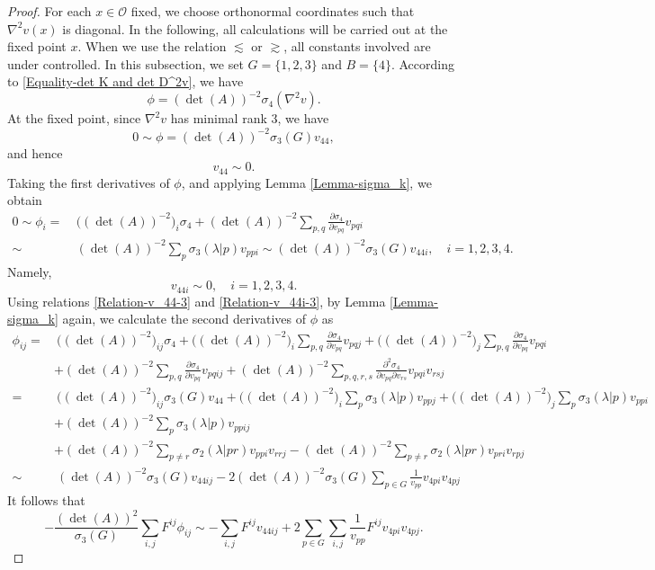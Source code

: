 \documentclass[11pt]{amsart}
\numberwithin{theorem}{section}
\numberwithin{equation}{section}
\begin{document}
\begin{proof}
For each $x\in\mathcal{O}$ fixed, we choose orthonormal coordinates such that $\nabla^2v(x)$ is diagonal. In the following, all calculations will be carried out at the fixed point $x$. When we use the relation $\lesssim$ or $\gtrsim$, all constants involved are under controlled. In this subsection, we set $G=\{1, 2, 3\}$ and $B=\{4\}$. According to \eqref{Equality-det K and det D^2v}, we have $$\phi=(\det(A))^{-2}\sigma_4(\nabla^2v).$$ At the fixed point, since $\nabla^2v$ has minimal rank $3$, we have $$0\sim\phi=(\det(A))^{-2}\sigma_3(G)v_{44},$$ and hence
\begin{equation}\label{Relation-v_44-3}
v_{44}\sim 0.
\end{equation}
Taking the first derivatives of $\phi$, and applying Lemma \ref{Lemma-sigma_k}, we obtain \begin{align*}
0\sim\phi_i
=&~\big((\det(A))^{-2}\big)_i\sigma_4+(\det(A))^{-2}\sum_{p,q}\frac{\partial\sigma_4}{\partial v_{pq}}v_{pqi}\\
\sim&~(\det(A))^{-2}\sum_p\sigma_3(\lambda|p)v_{ppi}\sim(\det(A))^{-2}\sigma_3(G)v_{44i},\quad i=1,2,3,4.
\end{align*}
Namely,
\begin{equation}\label{Relation-v_44i-3}
v_{44i}\sim0, \quad i=1, 2, 3, 4.
\end{equation}
Using relations \eqref{Relation-v_44-3} and \eqref{Relation-v_44i-3}, by Lemma \ref{Lemma-sigma_k} again, we calculate the second derivatives of $\phi$ as
\begin{align*}
\phi_{ij}
=&~\big((\det(A))^{-2}\big)_{ij}\sigma_4+\big((\det(A))^{-2}\big)_i\sum_{p,q}\frac{\partial\sigma_4}{\partial v_{pq}}v_{pqj}+\big((\det(A))^{-2}\big)_j\sum_{p,q}\frac{\partial\sigma_4}{\partial v_{pq}}v_{pqi}\\
&+(\det(A))^{-2}\sum_{p,q}\frac{\partial\sigma_4}{\partial v_{pq}}v_{pqij}+(\det(A))^{-2}\sum_{p,q,r,s}\frac{\partial^2\sigma_4}{\partial v_{pq}\partial v_{rs}}v_{pqi}v_{rsj}\\
=&~\big((\det(A))^{-2}\big)_{ij}\sigma_3(G)v_{44}+\big((\det(A))^{-2}\big)_i\sum_p\sigma_3(\lambda|p)v_{ppj}+\big((\det(A))^{-2}\big)_j\sum_p\sigma_3(\lambda|p)v_{ppi}\\
&+(\det(A))^{-2}\sum_p\sigma_3(\lambda|p)v_{ppij}\\
&+(\det(A))^{-2}\sum_{p\neq r}\sigma_2(\lambda|pr) v_{ppi}v_{rrj} -(\det(A))^{-2}\sum_{p\neq r}\sigma_2(\lambda|pr)v_{pri}v_{rpj}\\
\sim&~(\det(A))^{-2}\sigma_3(G)v_{44ij}-2(\det(A))^{-2}\sigma_3(G)\sum_{p\in G}\frac{1}{v_{pp}}v_{4pi}v_{4pj}
\end{align*}
It follows that
\begin{equation}\label{Equality-F1-3}
-\frac{(\det(A))^2}{\sigma_3(G)}\sum_{i,j}F^{ij}\phi_{ij}\sim-\sum_{i,j}F^{ij}v_{44ij}+2\sum_{p\in G}\sum_{i,j}\frac{1}{v_{pp}}F^{ij}v_{4pi}v_{4pj}.
\end{equation}
 

\end{proof}
\end{document}
